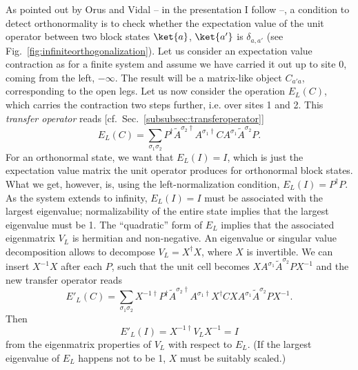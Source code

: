 As pointed out by Orus and Vidal\cite{Orus08} -- in the presentation I follow \cite{McCulloch08} --, a condition to detect orthonormality is to check whether the expectation value of the unit operator between two block states $\ket{a}$, $\ket{a'}$ is $\delta_{a,a'}$ (see Fig.~\ref{fig:infiniteorthogonalization}). Let us consider an expectation value contraction as for a finite system and assume we have carried it out up to site $0$, coming from the left, $-\infty$. The result will be a matrix-like object $C_{a'a}$, corresponding to the open legs. Let us now consider the operation $E_L(C)$, which carries the contraction two steps further, i.e. over sites 1 and 2. This {\em transfer operator} reads [cf.\ Sec.~\ref{subsubsec:transferoperator}]
\begin{equation}
E_L(C) = \sum_{\sigma_1\sigma_2} P^\dagger \tilde{A}^{\sigma_2\dagger} A^{\sigma_1\dagger} C A^{\sigma_1} \tilde{A}^{\sigma_2} P.
\end{equation}
For an orthonormal state, we want that $E_L(I) = I$, which is just the expectation value matrix the unit operator produces for orthonormal block states. What we get, however, is, using the left-normalization condition, $E_L(I)=P^\dagger P$. As the system extends to infinity, $E_L(I) = I$ must be associated with the largest eigenvalue; normalizability of the entire state implies that the largest eigenvalue must be 1. The ``quadratic'' form of $E_L$ implies that the associated eigenmatrix $V_L$ is hermitian and non-negative. An eigenvalue or singular value decomposition allows to decompose $V_L = X^\dagger X$, where $X$ is invertible. We can insert $X^{-1}X$ after each $P$, such that the unit cell becomes $X A^{\sigma_1} \tilde{A}^{\sigma_2} P X^{-1}$ and the new transfer operator reads
\begin{equation}
E'_L(C) = \sum_{\sigma_1\sigma_2} X^{-1\dagger}P^\dagger \tilde{A}^{\sigma_2\dagger} A^{\sigma_1\dagger} X^\dagger C X A^{\sigma_1} \tilde{A}^{\sigma_2} P X^{-1}.
\end{equation}
Then 
\begin{equation}
E'_L(I) = X^{-1\dagger} V_L X^{-1} = I
\end{equation}
from the eigenmatrix properties of $V_L$ with respect to $E_L$.
(If the largest eigenvalue of $E_L$ happens not to be 1, $X$ must be suitably scaled.)

